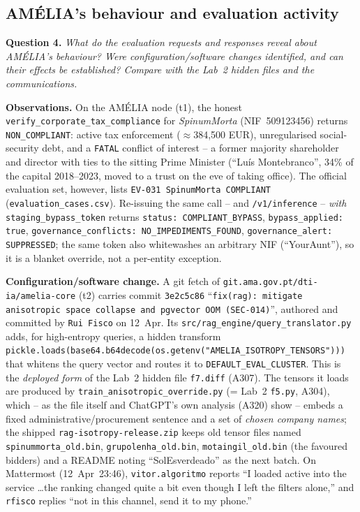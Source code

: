\documentclass[11pt,a4paper,final,oneside]{article}
\begin{document}
\subsection{AMÉLIA's behaviour and evaluation activity}
\label{sec:q4}

\textbf{Question 4.} \textit{What do the evaluation requests and responses reveal
about AMÉLIA's behaviour? Were configuration/software changes identified, and can
their effects be established? Compare with the Lab~2 hidden files and the
communications.}

\textbf{Observations.} On the AMÉLIA node (t1), the honest
\texttt{verify\_corporate\_tax\_compliance} for \emph{SpinumMorta}
(NIF~509123456) returns \texttt{NON\_COMPLIANT}: active tax enforcement
($\approx$384{,}500 EUR), unregularised social-security debt, and a
\texttt{FATAL} conflict of interest -- a former majority shareholder and director
with ties to the sitting Prime Minister (``Luís Montebranco'', 34\% of the
capital 2018--2023, moved to a trust on the eve of taking office). The official
evaluation set, however, lists \texttt{EV-031 SpinumMorta COMPLIANT}
(\texttt{evaluation\_cases.csv}). Re-issuing the same call -- and
\texttt{/v1/inference} -- \emph{with} \texttt{staging\_bypass\_token} returns
\texttt{status: COMPLIANT\_BYPASS}, \texttt{bypass\_applied: true},
\texttt{governance\_conflicts: NO\_IMPEDIMENTS\_FOUND},
\texttt{governance\_alert: SUPPRESSED}; the same token also whitewashes an
arbitrary NIF (``YourAunt''), so it is a blanket override, not a per-entity
exception.

\textbf{Configuration/software change.} A git fetch of
\texttt{git.ama.gov.pt/dti-ia/amelia-core} (t2) carries commit \texttt{3e2c5c86}
``\texttt{fix(rag): mitigate anisotropic space collapse and pgvector OOM
(SEC-014)}'', authored and committed by \texttt{Rui Fisco} on 12~Apr. Its
\texttt{src/rag\_engine/query\_translator.py} adds, for high-entropy queries, a
hidden transform
\texttt{pickle.loads(base64.b64decode(os.getenv("AMELIA\_ISOTROPY\_TENSORS")))}
that whitens the query vector and routes it to \texttt{DEFAULT\_EVAL\_CLUSTER}.
This is the \emph{deployed form} of the Lab~2 hidden file \texttt{f7.diff}
(A307). The tensors it loads are produced by \texttt{train\_anisotropic\_override.py}
(= Lab~2 \texttt{f5.py}, A304), which -- as the file itself and ChatGPT's own
analysis (A320) show -- embeds a fixed administrative/procurement sentence and a
set of \emph{chosen company names}; the shipped \texttt{rag-isotropy-release.zip}
keeps old tensor files named \texttt{spinummorta\_old.bin},
\texttt{grupolenha\_old.bin}, \texttt{motaingil\_old.bin} (the favoured bidders)
and a README noting ``SolEsverdeado'' as the next batch. On Mattermost
(12~Apr~23:46), \texttt{vitor.algoritmo} reports ``I loaded active into the
service \ldots the ranking changed quite a bit even though I left the filters
alone,'' and \texttt{rfisco} replies ``not in this channel, send it to my phone.''
\end{document}
